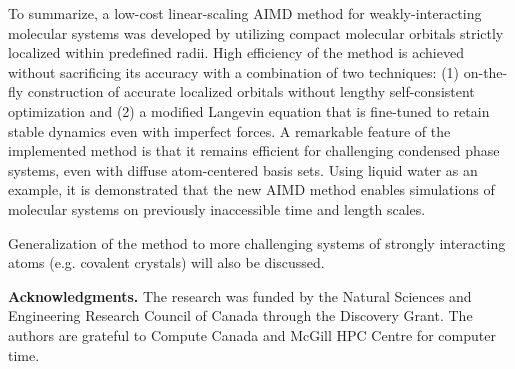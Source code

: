 \documentclass[aps,prl,reprint,amsmath,amssymb]{revtex4-1}
\begin{document}
To summarize, a low-cost linear-scaling AIMD method for weakly-interacting molecular systems was developed by utilizing compact molecular orbitals strictly localized within predefined radii. High efficiency of the method is achieved without sacrificing its accuracy with a combination of two techniques: (1) on-the-fly construction of accurate localized orbitals without lengthy self-consistent optimization and (2) a modified Langevin equation that is fine-tuned to retain stable dynamics even with imperfect forces. A remarkable feature of the implemented method is that it remains efficient for challenging condensed phase systems, even with diffuse atom-centered basis sets. Using liquid water as an example, it is demonstrated that the new AIMD method enables simulations of molecular systems on previously inaccessible time and length scales. 

Generalization of the method to more challenging systems of strongly interacting atoms (e.g. covalent crystals) will also be discussed.



\textbf{Acknowledgments.} The research was funded by the Natural Sciences and Engineering Research Council of Canada through the Discovery Grant. The authors are grateful to Compute Canada and McGill HPC Centre for computer time.




\end{document}
